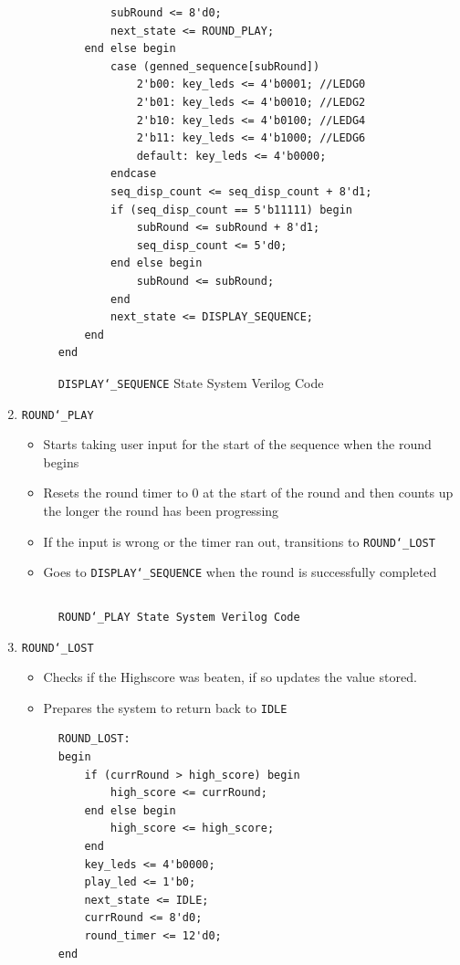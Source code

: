 \documentclass{report}
\begin{document}
\begin{enumerate}
\begin{figure}[H]
\begin{verbatim}
        subRound <= 8'd0;
        next_state <= ROUND_PLAY;
    end else begin
        case (genned_sequence[subRound])
            2'b00: key_leds <= 4'b0001; //LEDG0
            2'b01: key_leds <= 4'b0010; //LEDG2
            2'b10: key_leds <= 4'b0100; //LEDG4
            2'b11: key_leds <= 4'b1000; //LEDG6
            default: key_leds <= 4'b0000;
        endcase
        seq_disp_count <= seq_disp_count + 8'd1;
        if (seq_disp_count == 5'b11111) begin
            subRound <= subRound + 8'd1;
            seq_disp_count <= 5'd0;
        end else begin
            subRound <= subRound;
        end
        next_state <= DISPLAY_SEQUENCE;
    end
end
        \end{verbatim}
        \caption{\texttt{DISPLAY\char`_SEQUENCE} State System Verilog Code}
    \end{figure}
    \item \texttt{ROUND\char`_PLAY}
    \begin{itemize}
        \item Starts taking user input for the start of the sequence when the round begins
        \item Resets the round timer to 0 at the start of the round and then counts up the longer the round has been progressing
        \item If the input is wrong or the timer ran out, transitions to \texttt{ROUND\char`_LOST}
        \item Goes to \texttt{DISPLAY\char`_SEQUENCE} when the round is successfully completed
    \end{itemize}
    \begin{figure}[H]
    \small{\inputminted{sv}{ROUND_PLAY.sv}}
    \caption{\texttt{ROUND\char`_PLAY State System Verilog Code}}
    \end{figure}
    \item \hypertarget{round_lost}{\texttt{ROUND\char`_LOST}}
    \begin{itemize}
        \item Checks if the Highscore was beaten, if so updates the value stored.
        \item Prepares the system to return back to \texttt{IDLE}
    \end{itemize}
    \begin{figure}[H]
        \begin{verbatim}
ROUND_LOST:
begin
    if (currRound > high_score) begin
        high_score <= currRound;
    end else begin
        high_score <= high_score;
    end
    key_leds <= 4'b0000;
    play_led <= 1'b0;
    next_state <= IDLE;
    currRound <= 8'd0;
    round_timer <= 12'd0;   
end
        \end{verbatim}
    \end{figure}
\end{enumerate}
\end{document}
